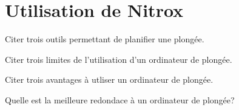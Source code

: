 \documentclass[english,12pt,a4paper]{article}
\begin{document}
	\section{Utilisation de Nitrox}
	\begin{outline}
		\1 Citer trois outils permettant de planifier une plongée.
			\2 \hspace{-2em}\hrulefill
			\2 \hspace{-2em}\hrulefill
			\2 \hspace{-2em}\hrulefill

		\1 Citer trois limites de l'utilisation d'un ordinateur de plongée.
			\2 \hspace{-2em}\hrulefill
			\2 \hspace{-2em}\hrulefill
			\2 \hspace{-2em}\hrulefill

		\1 Citer trois avantages à utliser un ordinateur de plongée.
			\2 \hspace{-2em}\hrulefill
			\2 \hspace{-2em}\hrulefill
			\2 \hspace{-2em}\hrulefill

		\1 Quelle est la meilleure redondace à un ordinateur de plongée?
			\2 \hspace{-2em}\hrulefill
			\2 \hspace{-2em}\hrulefill
	\end{outline}
	\pagebreak

\end{document}
